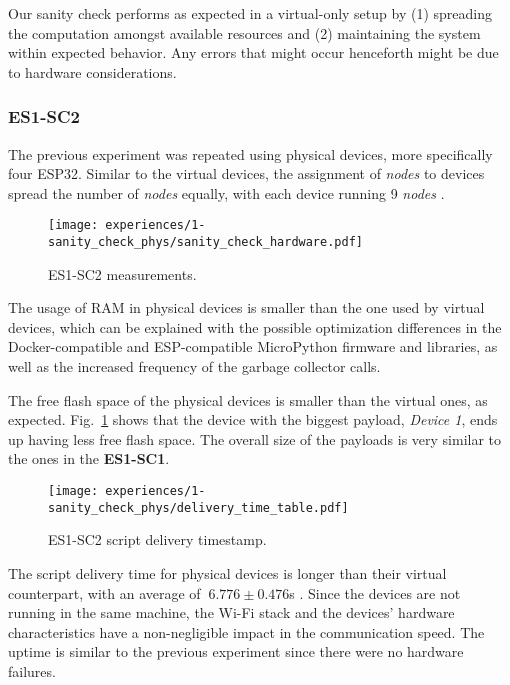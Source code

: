 Our sanity check performs as expected in a virtual-only setup by (1) spreading the computation amongst available resources and (2) maintaining the system within expected behavior. Any errors that might occur henceforth might be due to hardware considerations.


\subsubsection{ES1-SC2}\label{sec:sanity_check_phys_exp}

The previous experiment was repeated using physical devices, more specifically four ESP32. Similar to the virtual devices, the assignment of \textit{nodes} to devices spread the number of \textit{nodes} equally, with each device running 9 \textit{nodes} .

\begin{figure}[h]
\centering
\texttt{[image: experiences/1-sanity\_check\_phys/sanity\_check\_hardware.pdf]}
\caption[ES1-SC2 measurements.]{ES1-SC2 measurements.}\label{fig:sanity_check_phys_graph}
\end{figure}

The usage of RAM in physical devices is smaller than the one used by virtual devices, which can be explained with the possible optimization differences in the Docker-compatible and ESP-compatible MicroPython firmware and libraries, as well as the increased frequency of the garbage collector calls.

The free flash space of the physical devices is smaller than the virtual ones, as expected. Fig.~\ref{fig:sanity_check_phys_graph} shows that the device with the biggest payload, \textit{Device 1}, ends up having less free flash space. The overall size of the payloads is very similar to the ones in the \textbf{ES1-SC1}.

\begin{figure}[h]
\centering
\texttt{[image: experiences/1-sanity\_check\_phys/delivery\_time\_table.pdf]}
\caption[ES1-SC2 script delivery time.]{ES1-SC2 script delivery timestamp.}\label{fig:sanity_check_phys_delivery_time}
\end{figure}

The script delivery time for physical devices is longer than their virtual counterpart, with an average of $~6.776\pm0.476$s . Since the devices are not running in the same machine, the Wi-Fi stack and the devices' hardware characteristics have a non-negligible impact in the communication speed. The uptime is similar to the previous experiment since there were no hardware failures.

